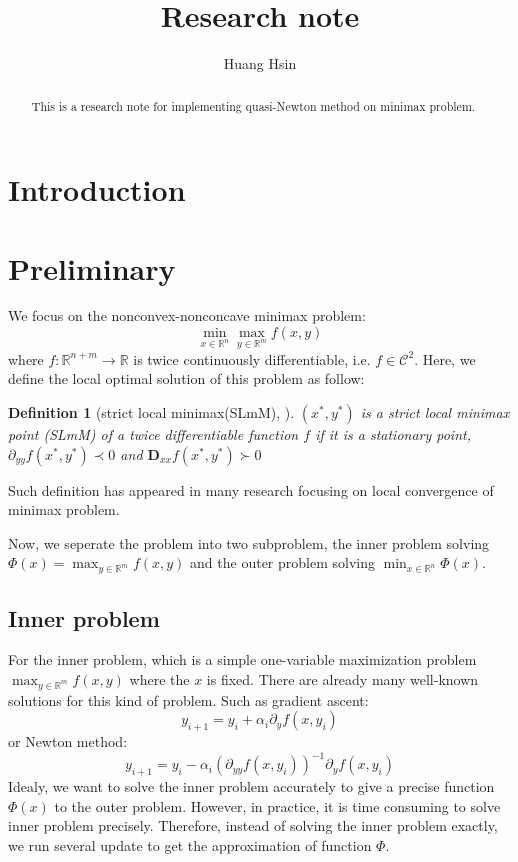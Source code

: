 \documentclass{article}
\author{Huang Hsin}
\title{Research note}
\newtheorem{definition}{Definition}
\begin{document}
\maketitle

\begin{abstract}
This is a research note for implementing quasi-Newton method on minimax problem.
\end{abstract}

\section{Introduction}

\section{Preliminary}

We focus on the nonconvex-nonconcave minimax problem:
\begin{equation}
    \min_{x \in \mathbb{R}^n} \max_{y \in \mathbb{R}^m} f(x,y)
\end{equation}
where $f: \mathbb{R}^{n+m} \to \mathbb{R}$ is twice continuously differentiable, i.e. $f \in \mathcal{C}^2$. Here, we define the local optimal solution of this problem as follow:
\begin{definition}[strict local minimax(SLmM), \cite{evtushenko1974minimax}]
    $(x^*, y^*)$ is a strict local minimax point (SLmM) of a twice differentiable function $f$ if it is a stationary point, $\partial_{yy}f(x^*,y^*) \prec 0$ and $\mathbf{D}_{xx}f(x^*,y^*) \succ 0$
\end{definition}

Such definition has appeared in many research focusing on local convergence of minimax problem.

Now, we seperate the problem into two subproblem, the inner problem solving $\Phi(x) = \max_{y \in \mathbb{R}^m}f(x,y)$ and the outer problem solving $\min_{x \in \mathbb{R}^n} \Phi(x)$.

\subsection{Inner problem}
\label{InnerProblem}
For the inner problem, which is a simple one-variable maximization problem $\max_{y \in \mathbb{R}^m}f(x,y)$ where the $x$ is fixed. There are already many well-known solutions for this kind of problem.
Such as gradient ascent:
\begin{equation}
    y_{i+1} = y_i + \alpha_i \partial_y f(x, y_i)
\end{equation}
or Newton method:
\begin{equation}
    y_{i+1} = y_i - \alpha_i (\partial_{yy} f(x, y_i))^{-1}\partial_y f(x, y_i)
\end{equation}
Idealy, we want to solve the inner problem accurately to give a precise function $\Phi(x)$ to the outer problem.
However, in practice, it is time consuming to solve inner problem precisely.
Therefore, instead of solving the inner problem exactly, we run several update to get the approximation of function $\Phi$.
\end{document}
